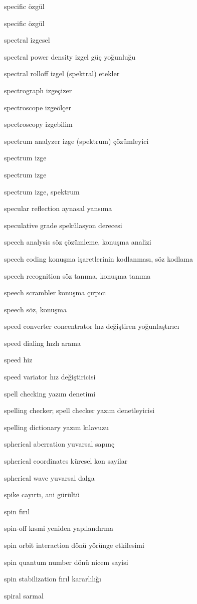 \documentclass[12pt,fleqn]{article}\usepackage{../../common}
\begin{document}
specific özgül

specific özgül

spectral izgesel

spectral power density izgel güç yoğunluğu

spectral rolloff izgel (spektral) etekler

spectrograph izgeçizer

spectroscope izgeölçer

spectroscopy izgebilim

spectrum analyzer izge (spektrum) çözümleyici

spectrum izge

spectrum izge

spectrum izge, spektrum

specular reflection aynasal yansıma

speculative grade spekülasyon derecesi

speech analysis söz çözümleme, konuşma analizi

speech coding konuşma işaretlerinin kodlanması, söz kodlama

speech recognition söz tanıma, konuşma tanıma

speech scrambler konuşma çırpıcı

speech söz, konuşma

speed converter concentrator hız değiştiren yoğunlaştırıcı

speed dialing hızlı arama

speed hiz

speed variator hız değiştiricisi

spell checking yazım denetimi

spelling checker; spell checker yazım denetleyicisi

spelling dictionary yazım kılavuzu

spherical aberration yuvarsal sapınç

spherical coordinates küresel kon sayilar

spherical wave yuvarsal dalga

spike cayırtı, ani gürültü

spin fırıl

spin-off kısmi yeniden yapılandırma

spin orbit interaction dönü yörünge etkilesimi

spin quantum number dönü nicem sayisi

spin stabilization fırıl kararlılığı

spiral sarmal
\end{document}
